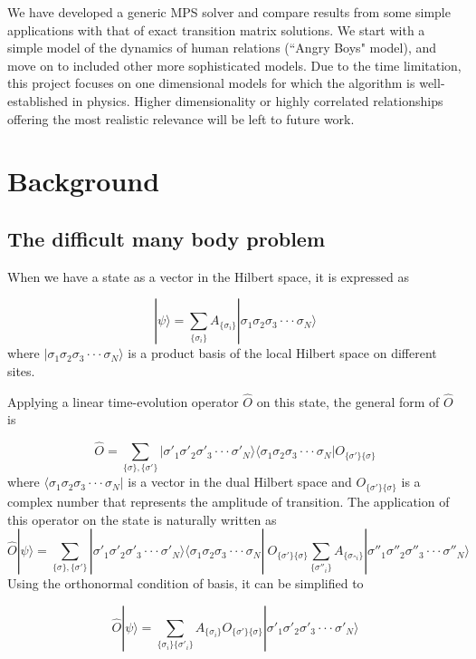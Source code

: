 \documentclass[english]{article}
\begin{document}
We have developed  a generic MPS solver and compare results from some simple applications with that of exact transition matrix solutions. We start with a simple model of the dynamics of human relations (``Angry Boys" model), and move on to included other more sophisticated models. Due to the time limitation, this project focuses on one dimensional models for which the algorithm is well-established in physics. Higher dimensionality or highly correlated relationships offering the most realistic relevance will be left to future work.

\section{Background}

\subsection{The difficult many body problem}

When we have a state as a vector in the Hilbert space, it is expressed
as

\[
|\psi\rangle=\sum_{\{\sigma_{i}\}}A_{\{\sigma_{i}\}}|\sigma_{1}\sigma_{2}\sigma_{3}\cdot\cdot\cdot\sigma_{N}\rangle
\]
where $|\sigma_{1}\sigma_{2}\sigma_{3}\cdot\cdot\cdot\sigma_{N}\rangle$
is a product basis of the local Hilbert space on different sites.

Applying a linear time-evolution operator $\hat{O}$ on this state,
the general form of $\hat{O}$ is

\[
\hat{O}=\sum_{\{\sigma\},\{\sigma'\}}|\sigma'_{1}\sigma'_{2}\sigma'_{3}\cdot\cdot\cdot\sigma'_{N}\rangle\langle\sigma_{1}\sigma_{2}\sigma_{3}\cdot\cdot\cdot\sigma_{N}|O_{\{\sigma'\}\{\sigma\}}
\]
where $\langle\sigma_{1}\sigma_{2}\sigma_{3}\cdot\cdot\cdot\sigma_{N}|$ is a vector in the dual Hilbert space and $O_{\{\sigma'\}\{\sigma\}}$ is a complex number that represents the amplitude of transition. The application of this operator on the state is naturally written as
\[
\hat{O}|\psi\rangle=\sum_{\{\sigma\},\{\sigma'\}}|\sigma'_{1}\sigma'_{2}\sigma'_{3}\cdot\cdot\cdot\sigma'_{N}\rangle\langle\sigma_{1}\sigma_{2}\sigma_{3}\cdot\cdot\cdot\sigma_{N}|\ O_{\{\sigma'\}\{\sigma\}}\sum_{\{\sigma''_{i}\}}A_{\{\sigma_{''i}\}}|\sigma''_{1}\sigma''_{2}\sigma''_{3}\cdot\cdot\cdot\sigma''_{N}\rangle
\]
Using the orthonormal condition of basis, it can be simplified to

\[
\hat{O}|\psi\rangle=\sum_{\{\sigma_{i}\}\{\sigma'_{i}\}}A_{\{\sigma_{i}\}}O_{\{\sigma'\}\{\sigma\}}|\sigma'_{1}\sigma'_{2}\sigma'_{3}\cdot\cdot\cdot\sigma'_{N}\rangle
\]
\end{document}

